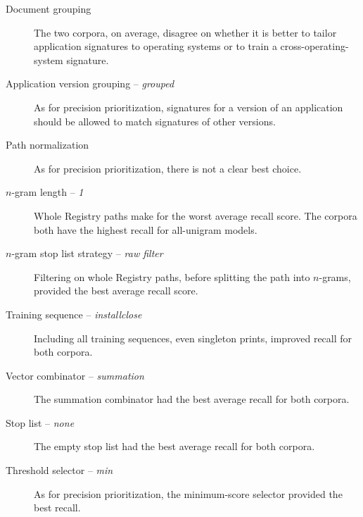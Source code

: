 \documentclass[11pt]{ucthesis}
\theoremstyle{plain}
\theoremstyle{definition}
\begin{document}
\begin{description}
\item[Document grouping] The two corpora, on average, disagree on whether it is better to tailor application signatures to operating systems or to train a cross-operating-system signature.  %
\item[Application version grouping -- \emph{grouped}] As for precision prioritization, signatures for a version of an application should be allowed to match signatures of other versions.  %
\item[Path normalization] As for precision prioritization, there is not a clear best choice.  %
%
\item[$n$-gram length -- \emph{1}] Whole Registry paths make for the worst average recall score.  The corpora both have the highest recall for all-unigram models.  %
%
\item[$n$-gram stop list strategy -- \emph{raw filter}] Filtering on whole Registry paths, before splitting the path into $n$-grams, provided the best average recall score.  %
\item[Training sequence -- \emph{installclose}] Including all training sequences, even singleton prints, improved recall for both corpora.  %
%
\item[Vector combinator -- \emph{summation}] The summation combinator had the best average recall for both corpora.  %
\item[Stop list -- \emph{none}] The empty stop list had the best average recall for both corpora.  %
\item[Threshold selector -- \emph{min}] As for precision prioritization, the minimum-score selector provided the best recall.  %
\end{description}
\end{document}
